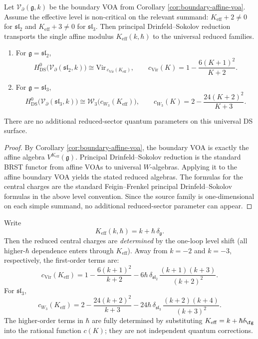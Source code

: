 \begin{theorem}\label{thm:boundary-ds-transport}
Let $\mathcal V_{\partial}(\mathfrak g,k)$ be the boundary VOA from
Corollary \ref{cor:boundary-affine-voa}.
Assume the effective level is non-critical on the relevant summand:
$K_{\mathrm{eff}}+2\neq 0$ for $\mathfrak{sl}_2$ and
$K_{\mathrm{eff}}+3\neq 0$ for $\mathfrak{sl}_3$.
Then principal Drinfeld--Sokolov reduction transports the single affine modulus
$K_{\mathrm{eff}}(k,\hbar)$ to the universal reduced families.

\begin{enumerate}
 \item For $\mathfrak g=\mathfrak{sl}_2$,
 \[
 H^0_{\mathrm{DS}}\bigl(\mathcal V_{\partial}(\mathfrak{sl}_2,k)\bigr)
 \cong
 \mathrm{Vir}_{\,c_{\mathrm{Vir}}(K_{\mathrm{eff}})},
 \qquad
 c_{\mathrm{Vir}}(K)=1-\frac{6(K+1)^2}{K+2}.
 \]
 \item For $\mathfrak g=\mathfrak{sl}_3$,
 \[
 H^0_{\mathrm{DS}}\bigl(\mathcal V_{\partial}(\mathfrak{sl}_3,k)\bigr)
 \cong
 \mathcal W_3\bigl(c_{W_3}(K_{\mathrm{eff}})\bigr),
 \qquad
 c_{W_3}(K)=2-\frac{24(K+2)^2}{K+3}.
 \]
\end{enumerate}
There are no additional reduced-sector quantum parameters on this universal DS surface.
\end{theorem}

\begin{proof}
By Corollary \ref{cor:boundary-affine-voa}, the boundary VOA is exactly the affine algebra
$V^{K_{\mathrm{eff}}}(\mathfrak g)$. Principal Drinfeld--Sokolov reduction is the standard BRST functor from
affine VOAs to universal $W$-algebras. Applying it to the affine boundary VOA yields the stated reduced
algebras. The formulas for the central charges are the standard Feigin--Frenkel principal
Drinfeld--Sokolov formulas in the above level convention. Since the source family is one-dimensional on each
simple summand, no additional reduced-sector parameter can appear.
\end{proof}

\begin{corollary}\label{cor:one-loop-reduced-c}
Write
\[
K_{\mathrm{eff}}(k,\hbar)=k+\hbar\,\delta_{\mathfrak g}.
\]
Then the reduced central charges are \emph{determined} by the one-loop level shift
(all higher-$\hbar$ dependence enters through $K_{\mathrm{eff}}$).
Away from $k=-2$ and $k=-3$, respectively, the first-order terms are:
\[
c_{\mathrm{Vir}}(K_{\mathrm{eff}})
=
1-\frac{6(k+1)^2}{k+2}
-
6\hbar\,\delta_{\mathfrak{sl}_2}\,\frac{(k+1)(k+3)}{(k+2)^2}.
\]
For $\mathfrak{sl}_3$,
\[
c_{W_3}(K_{\mathrm{eff}})
=
2-\frac{24(k+2)^2}{k+3}
-
24\hbar\,\delta_{\mathfrak{sl}_3}\,\frac{(k+2)(k+4)}{(k+3)^2}.
\]
The higher-order terms in $\hbar$ are fully determined by substituting $K_{\mathrm{eff}} = k + \hbar\delta_{\fg}$ into the rational function $c(K)$; they are not independent quantum corrections.
\end{corollary}

